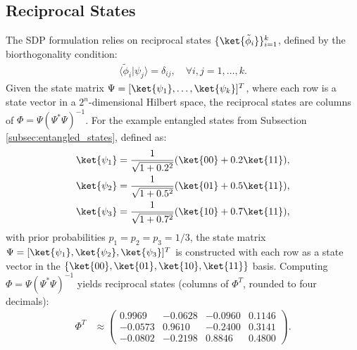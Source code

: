 \subsection{Reciprocal States}
The SDP formulation relies on reciprocal states \(\{ \ket{\tilde{\phi}_i} \}_{i=1}^k\),
defined by the biorthogonality condition:
\begin{align}
    \langle \tilde{\phi}_i | \psi_j \rangle = \delta_{ij}, \quad \forall i, j = 1, \ldots, k. \label{eq:biorthogonal}
\end{align}
Given the state matrix \(\Psi = [\ket{\psi_1}, \ldots, \ket{\psi_k}]^T\),
where each row is a state vector in a \(2^n\)-dimensional Hilbert space,
the reciprocal states are columns of \(\Phi = \Psi (\Psi^* \Psi)^{-1}\).
For the example entangled states from Subsection \ref{subsec:entangled_states}, defined as:
\begin{align}
    \ket{\psi_1} & = \frac{1}{\sqrt{1 + 0.2^2}} (\ket{00} + 0.2 \ket{11}), \notag                         \\
    \ket{\psi_2} & = \frac{1}{\sqrt{1 + 0.5^2}} (\ket{01} + 0.5 \ket{11}), \notag                         \\
    \ket{\psi_3} & = \frac{1}{\sqrt{1 + 0.7^2}} (\ket{10} + 0.7 \ket{11}), \label{eq:uqsd_example_states}
\end{align}
with prior probabilities \(p_1 = p_2 = p_3 = 1/3\), the state matrix
\(\Psi = [\ket{\psi_1}, \ket{\psi_2}, \ket{\psi_3}]^T\) is constructed with
each row as a state vector in the \(\{ \ket{00}, \ket{01}, \ket{10}, \ket{11} \}\) basis.
Computing \(\Phi = \Psi (\Psi^* \Psi)^{-1}\) yields reciprocal states
(columns of \(\Phi^T\), rounded to four decimals):
\begin{align}
    \Phi^T & \approx \begin{pmatrix} 0.9969 & -0.0628 & -0.0960 & 0.1146 \\ -0.0573 & 0.9610 & -0.2400 & 0.3141 \\ -0.0802 & -0.2198 & 0.8846 & 0.4800 \end{pmatrix}. \label{eq:phi_matrix}
\end{align}

